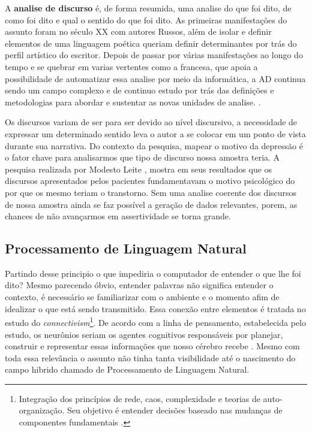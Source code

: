 A \textbf{analise de discurso} é, de forma resumida, uma analise do que foi dito, de como foi dito e qual o sentido do que foi dito. As primeiras manifestações do assunto foram no século XX com autores Russos, além de isolar e definir elementos de uma linguagem poética queriam definir determinantes por trás do perfil artístico do escritor. Depois de passar por várias manifestações ao longo do tempo e se quebrar em varias vertentes como a francesa, que apoia a possibilidade de automatizar essa analise por meio da informática, a AD continua sendo um campo complexo e de continuo estudo por trás das definições e metodologias para abordar e sustentar as novas unidades de analise. \cite[22]{souza2006ad}.

Os discursos variam de ser para ser devido ao nível discursivo, a necessidade de expressar um determinado sentido leva o autor a se colocar em um ponto de vista durante sua narrativa. Do contexto da pesquisa, mapear o motivo da depressão é o fator chave para analisarmos que tipo de discurso nossa amostra teria. A pesquisa realizada por Modesto Leite \cite[134]{modesto2005adepre}, mostra em seus resultados que os discursos apresentados pelos pacientes fundamentavam o motivo psicológico do por que os mesmo teriam o transtorno. Sem uma analise coerente dos discursos de nossa amostra ainda se faz possível a geração de dados relevantes, porem, as chances de não avançarmos em assertividade se torna grande.


\subsection{Processamento de Linguagem Natural}
Partindo desse principio o que impediria o computador de entender o que lhe foi dito? Mesmo parecendo óbvio, entender palavras não significa entender o contexto, é necessário se familiarizar com o ambiente e o momento afim de idealizar o que está sendo transmitido. Essa conexão entre elementos é tratada no estudo do \textit{connectivism}\footnote{Integração dos princípios de rede, caos, complexidade e teorias de auto-organização. Seu objetivo é entender decisões baseado nas mudanças de componentes fundamentais \cite[5]{siemens2014connectivism}.}. De acordo com a linha de pensamento, estabelecida pelo estudo, os neurônios seriam os agentes cognitivos responsáveis por planejar, construir e representar essas informações que nosso cérebro recebe \cite[22]{brandura1996}. Mesmo com toda essa relevância o assunto não tinha tanta visibilidade até o nascimento  do campo hibrido chamado de Processamento de Linguagem Natural. \cite[16]{russell2003artificial}
